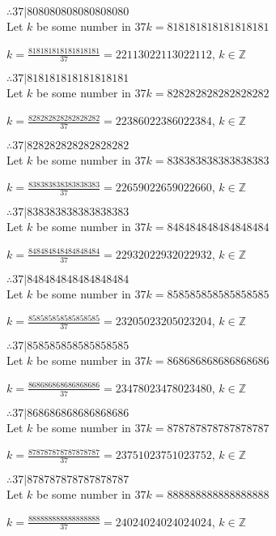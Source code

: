 \documentclass{article}
\begin{document}
$ \therefore  37|808080808080808080 $ \\

Let $k$ be some number in $37k = 818181818181818181$

$k = \frac{818181818181818181}{37} = 22113022113022112$, $k \in \mathbb{Z}$

$ \therefore  37|818181818181818181 $ \\

Let $k$ be some number in $37k = 828282828282828282$

$k = \frac{828282828282828282}{37} = 22386022386022384$, $k \in \mathbb{Z}$

$ \therefore  37|828282828282828282 $ \\

Let $k$ be some number in $37k = 838383838383838383$

$k = \frac{838383838383838383}{37} = 22659022659022660$, $k \in \mathbb{Z}$

$ \therefore  37|838383838383838383 $ \\

Let $k$ be some number in $37k = 848484848484848484$

$k = \frac{848484848484848484}{37} = 22932022932022932$, $k \in \mathbb{Z}$

$ \therefore  37|848484848484848484 $ \\

Let $k$ be some number in $37k = 858585858585858585$

$k = \frac{858585858585858585}{37} = 23205023205023204$, $k \in \mathbb{Z}$

$ \therefore  37|858585858585858585 $ \\

Let $k$ be some number in $37k = 868686868686868686$

$k = \frac{868686868686868686}{37} = 23478023478023480$, $k \in \mathbb{Z}$

$ \therefore  37|868686868686868686 $ \\

Let $k$ be some number in $37k = 878787878787878787$

$k = \frac{878787878787878787}{37} = 23751023751023752$, $k \in \mathbb{Z}$

$ \therefore  37|878787878787878787 $ \\

Let $k$ be some number in $37k = 888888888888888888$

$k = \frac{888888888888888888}{37} = 24024024024024024$, $k \in \mathbb{Z}$
\end{document}
